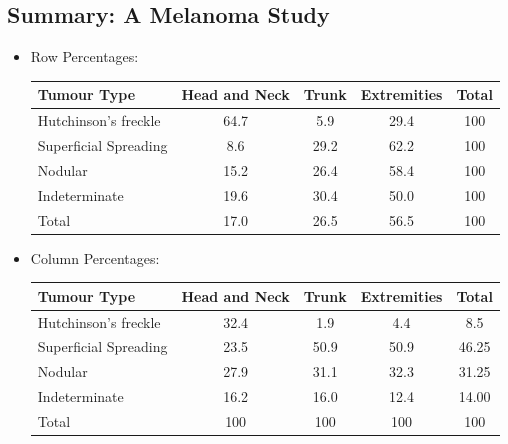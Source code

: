 \documentclass{article}\usepackage[]{graphicx}\usepackage[svgnames]{xcolor}
\begin{document}
\subsection*{Summary: A Melanoma Study}
\begin{itemize}
      \item Row Percentages:
            \begin{table}[H]
                  \centering
                  \begin{tabular}{lcccc}
                        Tumour Type           & Head and Neck & Trunk & Extremities & Total \\
                        \midrule
                        Hutchinson's freckle  & 64.7          & 5.9   & 29.4        & 100   \\
                        Superficial Spreading & 8.6           & 29.2  & 62.2        & 100   \\
                        Nodular               & 15.2          & 26.4  & 58.4        & 100   \\
                        Indeterminate         & 19.6          & 30.4  & 50.0        & 100   \\
                        Total                 & 17.0          & 26.5  & 56.5        & 100
                  \end{tabular}
            \end{table}
      \item Column Percentages:
            \begin{table}[H]
                  \centering
                  \begin{tabular}{lcccc}
                        Tumour Type           & Head and Neck & Trunk & Extremities & Total \\
                        \midrule
                        Hutchinson's freckle  & 32.4          & 1.9   & 4.4         & 8.5   \\
                        Superficial Spreading & 23.5          & 50.9  & 50.9        & 46.25 \\
                        Nodular               & 27.9          & 31.1  & 32.3        & 31.25 \\
                        Indeterminate         & 16.2          & 16.0  & 12.4        & 14.00 \\
                        Total                 & 100           & 100   & 100         & 100
                  \end{tabular}
            \end{table}

\end{itemize}
\end{document}
